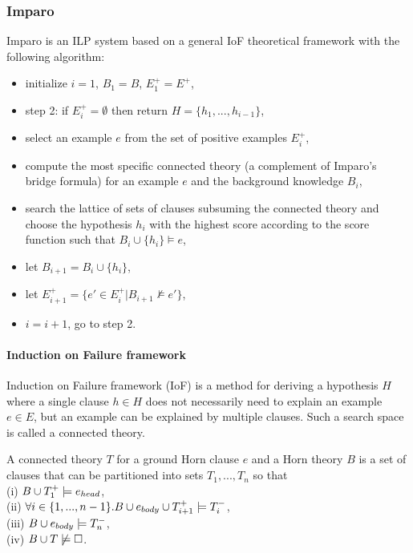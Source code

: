 \subsubsection{Imparo}
Imparo is an ILP system based on a general IoF theoretical framework with the following algorithm:
\begin{itemize}
\item initialize $i=1$, $B_1=B$, $E^+_1=E^+$,
\item step 2: if $E^+_i = \emptyset$ then return $H=\{h_1, ..., h_{i-1}\}$,
\item select an example $e$ from the set of positive examples $E^+_i$,
\item compute the most specific connected theory (a complement of Imparo's bridge formula) for an example $e$ and the background knowledge $B_i$,
\item search the lattice of sets of clauses subsuming the connected theory and choose the hypothesis $h_i$ with the highest score according to the score function such that $B_i \cup \{h_i\} \models e$,
\item let $B_{i+1}=B_i \cup \{h_i\}$,
\item let $E^+_{i+1}=\{e' \in E^+_i | B_{i+1} \not\models e'\}$,
\item $i=i+1$, go to step 2.
\end{itemize}

\paragraph{Induction on Failure framework\cite{kimber2012learning}}
Induction on Failure framework (IoF) is a method for deriving a hypothesis $H$ where a single clause $h \in H$ does not necessarily need to explain an example $e \in E$, but an example can be explained by multiple clauses. Such a search space is called a connected theory.
\begin{defn}
A connected theory $T$ for a ground Horn clause $e$ and a Horn theory $B$ is a set of clauses that can be partitioned into sets $T_1, ..., T_n$ so that\\
(i) $B \cup T_1^+ \models e_{head}$,\\
(ii) $\forall i \in \{1, ..., n-1\}. B \cup e_{body} \cup T_{i+1}^+ \models T_i^-$,\\
(iii) $B \cup e_{body} \models T_n^-$,\\
(iv) $B \cup T \not\models \square$.
\end{defn}

